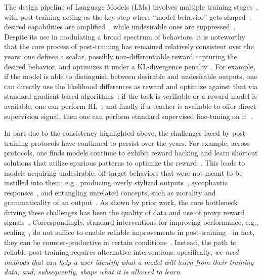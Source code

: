 \documentclass{article} %
\begin{document}
The design pipeline of Language Models (LMs) involves multiple training stages~\citep{singh2025openai, mythos, olmo2025olmo}, with post-training acting as the key step where ``model behavior'' gets shaped~\citep{ouyang2022training, bai2022constitutional, askell2021general}: desired capabilities are amplified~\citep{ward2025reasoning, guo2025deepseek, shao2024deepseekmath, shao2025deepseekmath}, while undesirable ones are suppressed~\citep{rafailov2023direct, azar2024general, ethayarajh2024kto, wang2024transforming, lee2023rlaif}.
% 
Despite its use in modulating a broad spectrum of behaviors, it is noteworthy that the core process of post-training has remained relatively consistent over the years: one defines a scalar, possibly non-differentiable reward capturing the desired behavior, and optimizes it under a KL-divergence penalty~\citep{christiano2017deep}.
% 
For example, if the model is able to distinguish between desirable and undesirable outputs, one can directly use the likelihood differences as reward and optimize against that via standard gradient-based algorithms~\citep{rafailov2023direct, kwiatkowski2026likelihood, ethayarajh2024kto, azar2024general}; 
% 
if the task is verifiable or a reward model is available, one can perform RL~\citep{lee2023rlaif, ouyang2022training, bai2022constitutional, shao2024deepseekmath, guo2025deepseek}; 
% 
and finally if a teacher is available to offer direct supervision signal, then one can perform standard supervised fine-tuning on it~\citep{li2022explanations, magister2023teaching, huang2023large, agarwal2024policy, shenfeld2026self, hubotter2026reinforcement, zhao2026self}.

In part due to the consistency highlighted above, the challenges faced by post-training protocols have continued to persist over the years.
% 
For example, across protocols, one finds models continue to exhibit reward hacking and learn shortcut solutions that utilize spurious patterns to optimize the reward~\citep{gao2023scaling, oaigoblins, cho2026value}.
% 
This leads to models acquiring undesirable, off-target behaviors that were not meant to be instilled into them; 
% 
e.g., producing overly stylized outputs~\citep{murray2026chunky, oaibold}, sycophantic responses~\citep{oaiscyo, wen2024language}, and entangling unrelated concepts, such as morality and grammaticality of an output~\citep{cho2026value}.
% 
As shown by prior work, the core bottleneck driving these challenges has been the quality of data and use of proxy reward signals~\citep{zhou2023lima, zhang2025best, kim2024rethinking, dong2024abilities, shen2024towards}.
% 
Correspondingly, standard interventions for improving performance, e.g., scaling~\citep{kaplan2020scaling, hoffmann2022training}, do not suffice to enable reliable improvements in post-training---in fact, they can be counter-productive in certain conditions~\citep{shen2024towards}.
% 
Instead, the path to reliable post-training requires alternative interventions: specifically, \textit{we need methods that can help a user identify what a model will learn from their training data, and, subsequently, shape what it is allowed to learn}.
\end{document}
